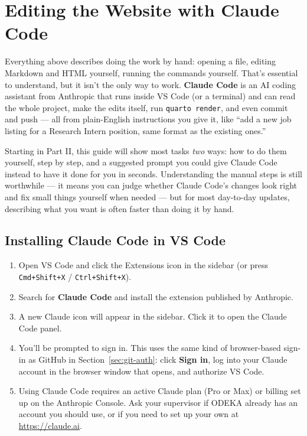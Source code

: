 \documentclass[11pt]{article}
\newcommand{\term}[1]{\textbf{#1}}
\newcommand{\cmd}[1]{\texttt{#1}}
\begin{document}
\section{Editing the Website with Claude Code}
\label{sec:claude-code}

Everything above describes doing the work by hand: opening a file,
editing Markdown and HTML yourself, running the commands yourself. That's
essential to understand, but it isn't the only way to work. \term{Claude
Code} is an AI coding assistant from Anthropic that runs inside VS Code
(or a terminal) and can read the whole project, make the edits itself,
run \cmd{quarto render}, and even commit and push --- all from
plain-English instructions you give it, like ``add a new job listing for
a Research Intern position, same format as the existing ones.''

Starting in Part II, this guide will show most tasks \emph{two} ways: how
to do them yourself, step by step, and a suggested prompt you could give
Claude Code instead to have it done for you in seconds. Understanding the
manual steps is still worthwhile --- it means you can judge whether
Claude Code's changes look right and fix small things yourself when
needed --- but for most day-to-day updates, describing what you want is
often faster than doing it by hand.

\subsection{Installing Claude Code in VS Code}

\begin{enumerate}
    \item Open VS Code and click the Extensions icon in the sidebar (or
    press \cmd{Cmd+Shift+X} / \cmd{Ctrl+Shift+X}).
    \item Search for \term{Claude Code} and install the extension
    published by Anthropic.
    \item A new Claude icon will appear in the sidebar. Click it to open
    the Claude Code panel.
    \item You'll be prompted to sign in. This uses the same kind of
    browser-based sign-in as GitHub in Section~\ref{sec:git-auth}: click
    \textbf{Sign in}, log into your Claude account in the browser window
    that opens, and authorize VS Code.
    \item Using Claude Code requires an active Claude plan (Pro or Max)
    or billing set up on the Anthropic Console. Ask your supervisor if
    ODEKA already has an account you should use, or if you need to set up
    your own at \url{https://claude.ai}.
\end{enumerate}
\end{document}
